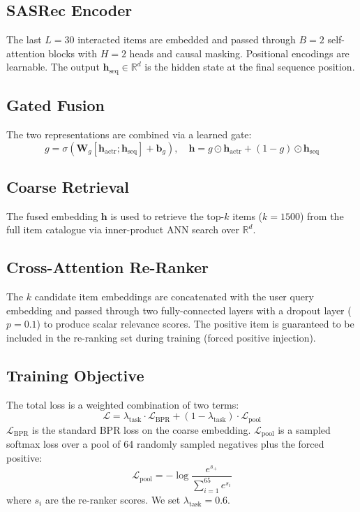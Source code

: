 \documentclass[conference]{IEEEtran}
\begin{document}
\subsection{SASRec Encoder}
The last $L{=}30$ interacted items are embedded and passed through
$B{=}2$ self-attention blocks with $H{=}2$ heads and causal masking.
Positional encodings are learnable.
The output $\mathbf{h}_{\text{seq}} \in \mathbb{R}^d$ is the
hidden state at the final sequence position.

\subsection{Gated Fusion}
The two representations are combined via a learned gate:
%
\begin{equation}
g = \sigma\!\left(\mathbf{W}_g [\mathbf{h}_{\text{actr}};
\mathbf{h}_{\text{seq}}] + \mathbf{b}_g\right), \quad
\mathbf{h} = g \odot \mathbf{h}_{\text{actr}} +
(1{-}g) \odot \mathbf{h}_{\text{seq}}
\end{equation}

\subsection{Coarse Retrieval}
The fused embedding $\mathbf{h}$ is used to retrieve the top-$k$
items ($k{=}1500$) from the full item catalogue via inner-product
ANN search over $\mathbb{R}^{d}$.

\subsection{Cross-Attention Re-Ranker}
The $k$ candidate item embeddings are concatenated with the user
query embedding and passed through two fully-connected layers with
a dropout layer ($p{=}0.1$) to produce scalar relevance scores.
The positive item is guaranteed to be included in the re-ranking
set during training (forced positive injection).

\subsection{Training Objective}
The total loss is a weighted combination of two terms:
%
\begin{equation}
\mathcal{L} = \lambda_{\text{task}} \cdot \mathcal{L}_{\text{BPR}}
+ (1 - \lambda_{\text{task}}) \cdot \mathcal{L}_{\text{pool}}
\end{equation}
%
$\mathcal{L}_{\text{BPR}}$ is the standard BPR loss on the coarse
embedding.
$\mathcal{L}_{\text{pool}}$ is a sampled softmax loss over a pool
of 64 randomly sampled negatives plus the forced positive:
%
\begin{equation}
\mathcal{L}_{\text{pool}} = -\log \frac{e^{s_+}}
{\sum_{i=1}^{65} e^{s_i}}
\end{equation}
%
where $s_i$ are the re-ranker scores.
We set $\lambda_{\text{task}} = 0.6$.
\end{document}

